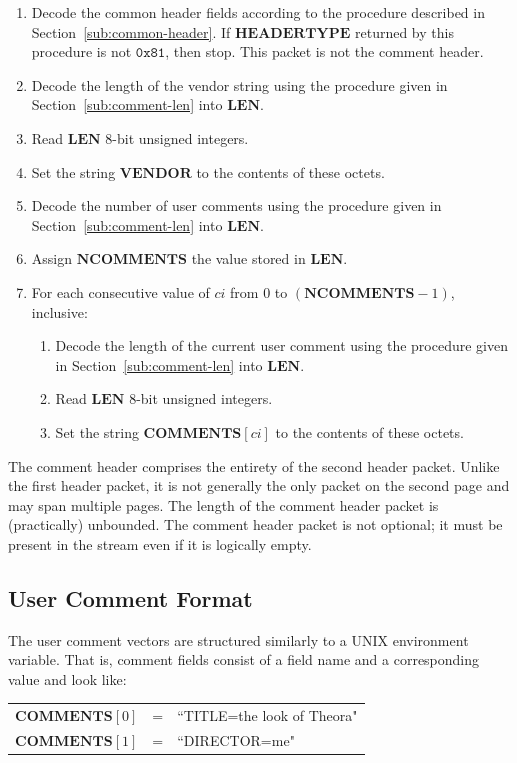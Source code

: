 \documentclass[9pt,letterpaper]{book}
\newcommand{\idx}[1]{{\ensuremath{\mathit{#1}}}}
\newcommand{\ci}{\idx{ci}}
\newcommand{\bitvar}[1]{\ensuremath{\mathbf{\bm{#1}}}}
\newcommand{\locvar}[1]{\ensuremath{\mathrm{#1}}}
\newcommand{\hex}[1]{\ensuremath{\mathtt{0x#1}}}
\numberwithin{equation}{chapter}
\numberwithin{figure}{chapter}
\numberwithin{table}{chapter}
\begin{document}
\begin{enumerate}
\item
Decode the common header fields according to the procedure described in
 Section~\ref{sub:common-header}.
If \bitvar{HEADERTYPE} returned by this procedure is not \hex{81}, then stop.
This packet is not the comment header.
\item
Decode the length of the vendor string using the procedure given in
 Section~\ref{sub:comment-len} into \bitvar{LEN}.
\item
Read \bitvar{LEN} 8-bit unsigned integers.
\item
Set the string \bitvar{VENDOR} to the contents of these octets.
\item
Decode the number of user comments using the procedure given in
 Section~\ref{sub:comment-len} into \bitvar{LEN}.
\item
Assign \bitvar{NCOMMENTS} the value stored in \bitvar{LEN}.
\item
For each consecutive value of \locvar{\ci} from $0$ to
 $(\bitvar{NCOMMENTS}-1)$, inclusive:
\begin{enumerate}
\item
Decode the length of the current user comment using the procedure given in
 Section~\ref{sub:comment-len} into \bitvar{LEN}.
\item
Read \bitvar{LEN} 8-bit unsigned integers.
\item
Set the string $\bitvar{COMMENTS}[\locvar{\ci}]$ to the contents of these
 octets.
\end{enumerate}
\end{enumerate}

The comment header comprises the entirety of the second header packet.
Unlike the first header packet, it is not generally the only packet on the
 second page and may span multiple pages.
The length of the comment header packet is (practically) unbounded.
The comment header packet is not optional; it must be present in the stream
 even if it is logically empty.


\subsection{User Comment Format}

The user comment vectors are structured similarly to a UNIX environment
 variable.
That is, comment fields consist of a field name and a corresponding value and
 look like:
\begin{center}
\begin{tabular}{rcl}
$\bitvar{COMMENTS}[0]$ & = & ``TITLE=the look of Theora" \\
$\bitvar{COMMENTS}[1]$ & = & ``DIRECTOR=me"
\end{tabular}
\end{center}
\end{document}
